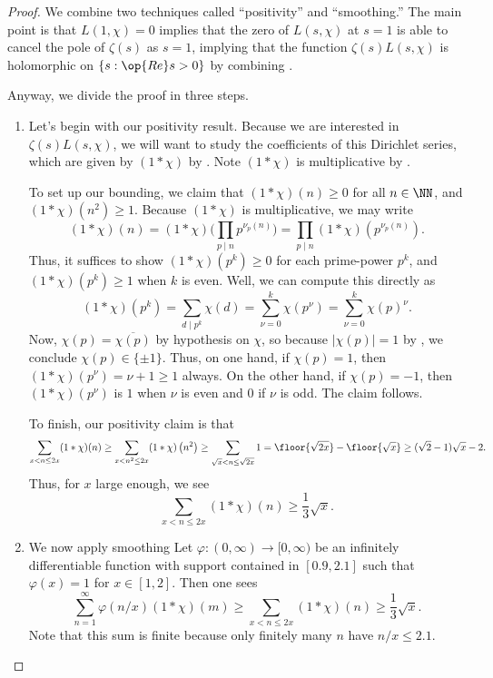 \documentclass[../notes.tex]{subfiles}
\begin{document}
\begin{proof}
	We combine two techniques called ``positivity'' and ``smoothing.'' The main point is that $L(1,\chi)=0$ implies that the zero of $L(s,\chi)$ at $s=1$ is able to cancel the pole of $\zeta(s)$ as $s=1$, implying that the function $\zeta(s)L(s,\chi)$ is holomorphic on $\{s:\op{Re}s>0\}$ by combining .

	Anyway, we divide the proof in three steps.
	\begin{enumerate}
		\item Let's begin with our positivity result. Because we are interested in $\zeta(s)L(s,\chi)$, we will want to study the coefficients of this Dirichlet series, which are given by $(1*\chi)$ by . Note $(1*\chi)$ is multiplicative by .

		To set up our bounding, we claim that $(1*\chi)(n)\ge0$ for all $n\in\NN$, and $(1*\chi)\left(n^2\right)\ge1$. Because $(1*\chi)$ is multiplicative, we may write
		\[(1*\chi)(n)=(1*\chi)\Bigg(\prod_{p\mid n}p^{\nu_p(n)}\Bigg)=\prod_{p\mid n}(1*\chi)\left(p^{\nu_p(n)}\right).\]
		Thus, it suffices to show $(1*\chi)\left(p^k\right)\ge0$ for each prime-power $p^k$, and $(1*\chi)\left(p^k\right)\ge1$ when $k$ is even. Well, we can compute this directly as
		\[(1*\chi)\left(p^k\right)=\sum_{d\mid p^k}\chi(d)=\sum_{\nu=0}^k\chi\left(p^\nu\right)=\sum_{\nu=0}^k\chi(p)^\nu.\]
		Now, $\chi(p)=\overline{\chi(p)}$ by hypothesis on $\chi$, so because $|\chi(p)|=1$ by , we conclude $\chi(p)\in\{\pm1\}$. Thus, on one hand, if $\chi(p)=1$, then $(1*\chi)\left(p^\nu\right)=\nu+1\ge1$ always. On the other hand, if $\chi(p)=-1$, then $(1*\chi)\left(p^\nu\right)$ is $1$ when $\nu$ is even and $0$ if $\nu$ is odd. The claim follows.
	
		To finish, our positivity claim is that
		\[\sum_{x<n\le2x}(1*\chi)(n)\ge\sum_{x<n^2\le2x}(1*\chi)\left(n^2\right)\ge\sum_{\sqrt x<n\le\sqrt{2x}}1=\floor{\sqrt{2x}}-\floor{\sqrt x}\ge(\sqrt2-1)\sqrt x-2.\]
		Thus, for $x$ large enough, we see
		\[\sum_{x<n\le2x}(1*\chi)(n)\ge\frac13\sqrt x.\]

		\item We now apply smoothing Let $\varphi\colon(0,\infty)\to[0,\infty)$ be an infinitely differentiable function with support contained in $[0.9,2.1]$ such that $\varphi(x)=1$ for $x\in[1,2]$. Then one sees
		\[\sum_{n=1}^\infty\varphi(n/x)(1*\chi)(m)\ge\sum_{x<n\le2x}(1*\chi)(n)\ge\frac13\sqrt x.\]
		Note that this sum is finite because only finitely many $n$ have $n/x\le2.1$.
	

\end{enumerate}
\end{proof}
\end{document}
